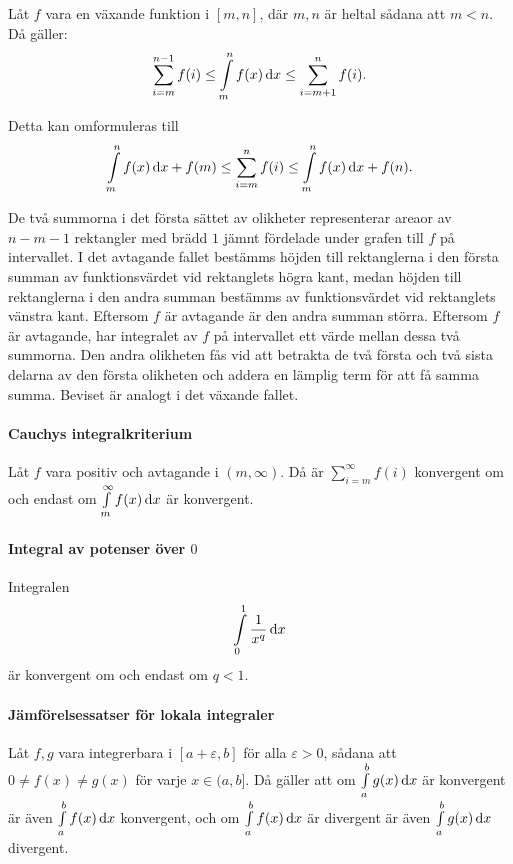 Låt $f$ vara en växande funktion i $[m, n]$, där $m, n$ är heltal sådana att $m < n$. Då gäller:
\begin{align*}
	\sum\limits_{i = m}^{n - 1}f(i)\leq \int\limits_{m}^{n}f(x)\dd{x}\leq \sum\limits_{i = m + 1}^{n}f(i).
\end{align*}

Detta kan omformuleras till
\begin{align*}
	\int\limits_{m}^{n}f(x)\dd{x} + f(m)\leq \sum\limits_{i = m}^{n}f(i)\leq \int\limits_{m}^{n}f(x)\dd{x} + f(n).
\end{align*}

\proof
De två summorna i det första sättet av olikheter representerar areaor av $n - m - 1$ rektangler med brädd $1$ jämnt fördelade under grafen till $f$ på intervallet. I det avtagande fallet bestämms höjden till rektanglerna i den första summan av funktionsvärdet vid rektanglets högra kant, medan höjden till rektanglerna i den andra summan bestämms av funktionsvärdet vid rektanglets vänstra kant. Eftersom $f$ är avtagande är den andra summan störra. Eftersom $f$ är avtagande, har integralet av $f$ på intervallet ett värde mellan dessa två summorna. Den andra olikheten fås vid att betrakta de två första och två sista delarna av den första olikheten och addera en lämplig term för att få samma summa. Beviset är analogt i det växande fallet.

\paragraph{Cauchys integralkriterium}
Låt $f$ vara positiv och avtagande i $(m, \infty)$. Då är $\sum\limits_{i = m}^{\infty}f(i)$ konvergent om och endast om $\int\limits_{m}^{\infty}f(x)\dd{x}$ är konvergent.

\proof

\paragraph{Integral av potenser över $0$}
Integralen
\begin{align*}
	\int\limits_{0}^{1}\frac{1}{x^q}\dd{x}
\end{align*}
är konvergent om och endast om $q < 1$.

\proof

\paragraph{Jämförelsessatser för lokala integraler}
Låt $f, g$ vara integrerbara i $[a + \varepsilon, b]$ för alla $\varepsilon > 0$, sådana att $0\neq f(x)\neq g(x)$ för varje $x\in (a, b]$. Då gäller att om $\int\limits_{a}^{b}g(x)\dd{x}$ är konvergent är även $\int\limits_{a}^{b}f(x)\dd{x}$ konvergent, och om $\int\limits_{a}^{b}f(x)\dd{x}$ är divergent är även $\int\limits_{a}^{b}g(x)\dd{x}$ divergent.


